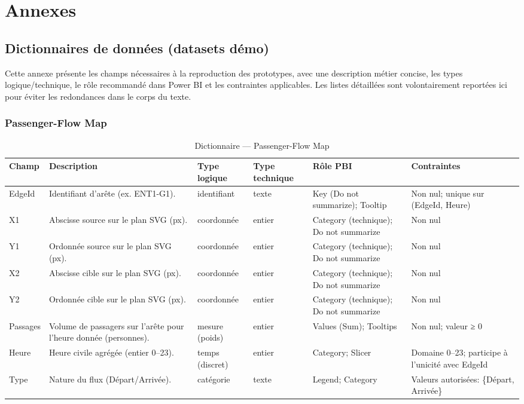 \appendix

\chapter{Annexes}


\section{Dictionnaires de données (datasets démo)}
\label{ann:a1-dictionnaires}

Cette annexe présente les champs nécessaires à la reproduction des prototypes, avec une description métier concise,
les types logique/technique, le rôle recommandé dans Power BI et les contraintes applicables. Les listes détaillées
sont volontairement reportées ici pour éviter les redondances dans le corps du texte.

\subsection{Passenger-Flow Map}
\begin{table}[ht]
\small
\setlength{\tabcolsep}{4pt}
\centering
\begin{tabularx}{\linewidth}{l X l l X X}
\toprule
Champ & Description & Type logique & Type technique & Rôle PBI & Contraintes\\
\midrule
EdgeId & Identifiant d’arête (ex. ENT1-G1). & identifiant & texte & Key (Do not summarize); Tooltip & Non nul; unique sur (EdgeId, Heure) \\
X1 & Abscisse source sur le plan SVG (px). & coordonnée & entier & Category (technique); Do not summarize & Non nul \\
Y1 & Ordonnée source sur le plan SVG (px). & coordonnée & entier & Category (technique); Do not summarize & Non nul \\
X2 & Abscisse cible sur le plan SVG (px). & coordonnée & entier & Category (technique); Do not summarize & Non nul \\
Y2 & Ordonnée cible sur le plan SVG (px). & coordonnée & entier & Category (technique); Do not summarize & Non nul \\
Passages & Volume de passagers sur l’arête pour l’heure donnée (personnes). & mesure (poids) & entier & Values (Sum); Tooltips & Non nul; valeur ≥ 0 \\
Heure & Heure civile agrégée (entier 0–23). & temps (discret) & entier & Category; Slicer & Domaine 0–23; participe à l’unicité avec EdgeId \\
Type & Nature du flux (Départ/Arrivée). & catégorie & texte & Legend; Category & Valeurs autorisées: \{Départ, Arrivée\} \\
\bottomrule
\end{tabularx}
\caption{Dictionnaire — Passenger-Flow Map}
\label{tab:a1-flows-compact}
\end{table}


